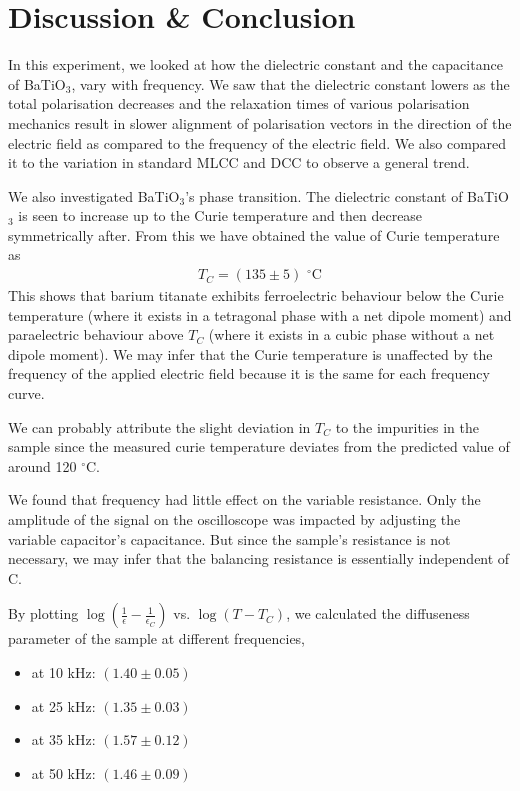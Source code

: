 \section{Discussion \& Conclusion}

In this experiment, we looked at how the dielectric constant and the capacitance of BaTiO$_3$, vary with frequency. We saw that the dielectric constant lowers as the total polarisation decreases and the relaxation times of various polarisation mechanics result in slower alignment of polarisation vectors in the direction of the electric field as compared to the frequency of the electric field. We also compared it to the variation in standard MLCC and DCC to observe a general trend.
	
We also investigated BaTiO$_3$'s phase transition. The dielectric constant of BaTiO$_3$ is seen to increase up to the Curie temperature and then decrease symmetrically after.
From this we have obtained the value of Curie temperature as
\begin{align*}
    T_C = (135 \pm 5)\,\,^\circ\text{C}
\end{align*}
This shows that barium titanate exhibits ferroelectric behaviour below the Curie temperature (where it exists in a tetragonal phase with a net dipole moment) and paraelectric behaviour above $T_C$ (where it exists in a cubic phase without a net dipole moment). We may infer that the Curie temperature is unaffected by the frequency of the applied electric field because it is the same for each frequency curve.

We can probably attribute the slight deviation in $T_C$ to the impurities in the sample since the measured curie temperature deviates from the predicted value of around 120 $^\circ$C.

We found that frequency had little effect on the variable resistance. Only the amplitude of the signal on the oscilloscope was impacted by adjusting the variable capacitor's capacitance. But since the sample's resistance is not necessary, we may infer that the balancing resistance is essentially independent of C.
	
By plotting $\log(\frac{1}{\epsilon}-\frac{1}{\epsilon_C})$ vs. $\log(T-T_C)$, we calculated the diffuseness parameter of the sample at different frequencies,

\begin{itemize}
    \item at 10 kHz: $(1.40 \pm 0.05)$
    \item at 25 kHz: $(1.35 \pm 0.03)$
    \item at 35 kHz: $(1.57 \pm 0.12)$
    \item at 50 kHz: $(1.46 \pm 0.09)$\\
\end{itemize}

